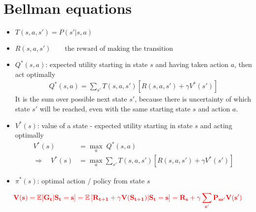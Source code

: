 \section{Bellman equations}
\begin{itemize}
	\item $T(s, a, s') = P(s'| s, a)$ \qquad {}
	\item $R(s, a, s') \qquad \text{the reward of making the transition}$
	\item $Q^*(s, a)$: expected utility starting in state $s$ and having taken action $a$, then act optimally
	\begin{align}
		Q^*(s, a) = \sum_{s'} T(s, a, s') \left[ R(s, a, s') + \gamma V^*(s') \right]
	\end{align}
	It is the sum over possible next state $s'$, because there is uncertainty of which state $s'$ will be reached, even with the same starting state $s$ and action $a$.
	\item $V^*(s)$: value of a state - expected utility starting in state $s$ and acting optimally
	\begin{align}
		V^*(s) & = \underset{a}{\max}\;Q^*(s, a)\\
		\Rightarrow \quad V^*(s) & = \underset{a}{\max} \sum_{s'} T(s, a, s') \left[ R(s, a, s') + \gamma V^*(s') \right]
	\end{align}
	
	\item $\pi^*(s)$: optimal action / policy from state $s$
\end{itemize}

\begin{equation}
	\textbf{\color{red} $\displaystyle \mathbf{V(s) = \mathbb{E}[G_t|S_t = s] = \mathbb{E}\left[ R_{t+1} + \gamma V(S_{t+1}) | S_t = s \right] = R_s + \gamma\sum_{s'} P_{ss'} V(s')}$}
\end{equation}
